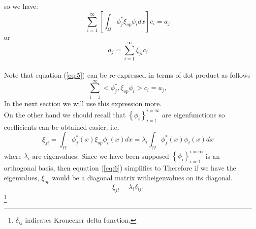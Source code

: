 \documentclass[12pt, letterpaper]{article}
\begin{document}
so we have:
\begin{equation}
\label{eq:5}
    \sum_{i=1}^{\infty}[\int_{\Omega}\phi_{j}^{*}\xi_{op}\phi_{i}dx]c_{i}=a_{j}
\end{equation}or\\
$$a_{j}=\sum_{i=1}^{\infty}\xi_{ji}c_{i}$$\\
Note that equation (\ref{eq:5}) can be re-expressed in terms of dot product as follows
\begin{equation}
    \sum_{i=1}^{\infty}<\phi_{j}^{*},\xi_{op}\phi_{i}> c_{i}= a_{j},
\end{equation}
 In the next section we will use this expression more.
\\On the other hand we should recall that $\left\{\phi_{i}\right\}_{i=1}^{i=\infty}$ are eigenfunctions so coefficients can be obtained easier, i.e.
\begin{equation}
\label{eq:6}
    \xi_{ji}=\int_{\Omega}\phi_{j}^{*}(x)\xi_{op}\phi_{i}(x)dx= \lambda_{i}\int_{\Omega}\phi_{j}^{*}(x)\phi_{i}(x)dx
\end{equation}
where $\lambda_{i}$ are eigenvalues. Since we have been supposed $\left\{\phi_{i}\right\}_{i=1}^{i=\infty}$ is an orthogonal basis, then equation (\ref{eq:6}) simplifies to 
Therefore if we have the eigenvalues, $\xi_{op}$ would be a diagonal matrix witheigenvalues on its diagonal.
$$\xi_{ji}= \lambda_{i}\delta_{ij}.$$ \footnote{$\delta_{ij}$ indicates Kronecker delta function.}

\end{document}
